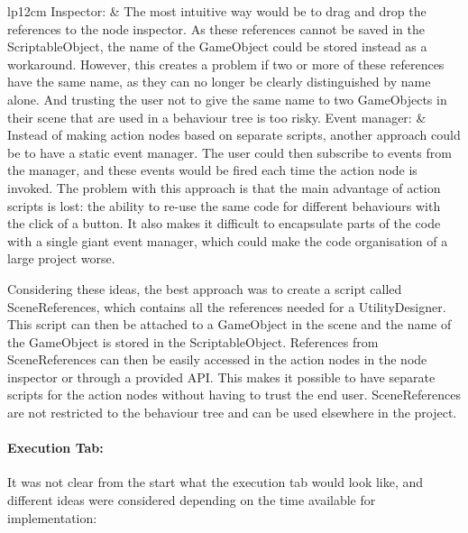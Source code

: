 \begin{tabular}{lp{12cm}}
Inspector: & The most intuitive way would be to drag and drop the references to the node inspector. As these references cannot be saved in the ScriptableObject, the name of the GameObject could be stored instead as a workaround. However, this creates a problem if two or more of these references have the same name, as they can no longer be clearly distinguished by name alone. And trusting the user not to give the same name to two GameObjects in their scene that are used in a behaviour tree is too risky. \cr
Event manager: & Instead of making action nodes based on separate scripts, another approach could be to have a static event manager. The user could then subscribe to events from the manager, and these events would be fired each time the action node is invoked. The problem with this approach is that the main advantage of action scripts is lost: the ability to re-use the same code for different behaviours with the click of a button. It also makes it difficult to encapsulate parts of the code with a single giant event manager, which could make the code organisation of a large project worse.
\end{tabular}

Considering these ideas, the best approach was to create a script called SceneReferences, which contains all the references needed for a UtilityDesigner. This script can then be attached to a GameObject in the scene and the name of the GameObject is stored in the ScriptableObject. References from SceneReferences can then be easily accessed in the action nodes in the node inspector or through a provided API. This makes it possible to have separate scripts for the action nodes without having to trust the end user. SceneReferences are not restricted to the behaviour tree and can be used elsewhere in the project.

\newpage

\paragraph{Execution Tab:}
It was not clear from the start what the execution tab would look like, and different ideas were considered depending on the time available for implementation:

